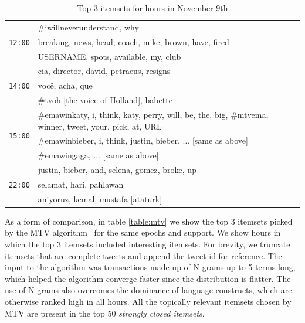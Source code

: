 \documentclass[letterpaper,12pt,titlepage,oneside,final]{book}
\begin{document}
\begin{table}
\begin{center}
\small
\def\arraystretch{1.1}
\begin{tabular}{|p{.6cm}|p{7.5cm}|}

\hline
\multirow{3}{*}{\texttt{12:00}} 
& \#iwillneverunderstand, why\\\cline{2-2}
& breaking, news, head, coach, mike, brown, have, fired  \\\cline{2-2}
& USERNAME, spots, available, my, club \\\hline
\multirow{3}{*}{\texttt{14:00}} 
& cia, director, david, petraeus, resigns \\\cline{2-2}
& voc\^{e}, acha, que \\\cline{2-2}
& \#tvoh [the voice of Holland], babette \\\hline
\multirow{3}{*}{\texttt{15:00}} & \#emawinkaty, i, think, katy, perry, will, be, the, big,  \#mtvema, winner, tweet, your, pick, at, URL
\\ \cline{2-2}
& \#emawinbieber, i, think, justin, bieber, ... [same as above] \\ \cline{2-2}
& \#emawingaga, ... [same as above]  \\\hline														
\multirow{3}{*}{\texttt{22:00}} & justin, bieber, and, selena, gomez, broke, up
\\ \cline{2-2}
& selamat, hari, pahlawan \\\cline{2-2}
& aniyoruz, kemal, mustafa [ataturk] \\ \hline
\end{tabular}
\end{center}
\caption{Top 3 itemsets for hours in November 9th}
 \label{table:nov9}
\end{table}


As a form of comparison, in table \ref{table:mtv} we show the top 3 itemsets picked by the MTV algorithm~\cite{mampaey2011tell} for the same epochs and support.
% 
We show hours in which the top 3 itemsets included interesting itemsets. For brevity, we truncate itemsets that are complete tweets and append the tweet id for reference.
% 
The input to the algorithm was transactions made up of N-grams up to 5 terms long, which helped the algorithm converge faster since the distribution is flatter. 
The use of N-grams also overcomes the dominance of language constructs, which are otherwise ranked high in all hours. 
All the topically relevant itemsets chosen by MTV are present in the top 50 \emph{strongly closed itemsets}.
\end{document}
